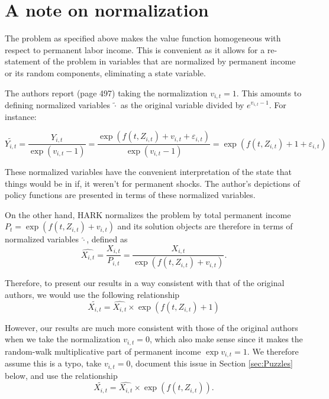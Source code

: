 \documentclass[./CGMPortfolio.tex]{subfiles}
\begin{document}


\hypertarget{Normalization}{}
\section{A note on normalization}

The problem as specified above makes the value function homogeneous with respect to permanent labor income. This is convenient as it allows for a re-statement of the problem in variables that are normalized by permanent income or its random components, eliminating a state variable.

The authors report (page 497) taking the normalization $v_{i,t} = 1$. This amounts to defining normalized variables $\tilde{\cdot}$ as the original variable divided by $e^{v_{i,t}-1}$. For instance:

\begin{equation}
\tilde{Y_{i,t}} = \frac{Y_{i,t}}{\exp(v_{i,t}-1)} = \frac{\exp (f(t,Z_{i,t}) + v_{i,t} + \varepsilon_{i,t})}{\exp(v_{i,t}-1)} = \exp( f(t,Z_{i,t}) + 1 + \varepsilon_{i,t} )
\end{equation}

These normalized variables have the convenient interpretation of the state that things would be in if, it weren't for permanent shocks. The author's depictions of policy functions are presented in terms of these normalized variables.

On the other hand, HARK normalizes the problem by total permanent income $P_t = \exp (f(t,Z_{i,t}) + v_{i,t})$ and its solution objects are therefore in terms of normalized variables $\hat{\cdot}$, defined as
\begin{equation}
\hat{X_{i,t}} = \frac{X_{i,t}}{P_{i,t}} = \frac{X_{i,t}}{\exp (f(t,Z_{i,t}) + v_{i,t})}.
\end{equation}

Therefore, to present our results in a way consistent with that of the original authors, we would use the following relationship
\begin{equation}
\tilde{X_{i,t}} = \hat{X_{i,t}} \times \exp (f(t,Z_{i,t})+1)
\end{equation}

However, our results are much more consistent with those of the original authors when we take the normalization $v_{i,t} = 0$, which also make sense since it makes the random-walk multiplicative part of permanent income $\exp{v_{i,t}}=1$. We therefore assume this is a typo, take $v_{i,t} = 0$, document this issue in Section \ref{sec:Puzzles} below, and use the relationship
\begin{equation}
\tilde{X_{i,t}} = \hat{X_{i,t}} \times \exp (f(t,Z_{i,t})).
\end{equation}
\end{document}
